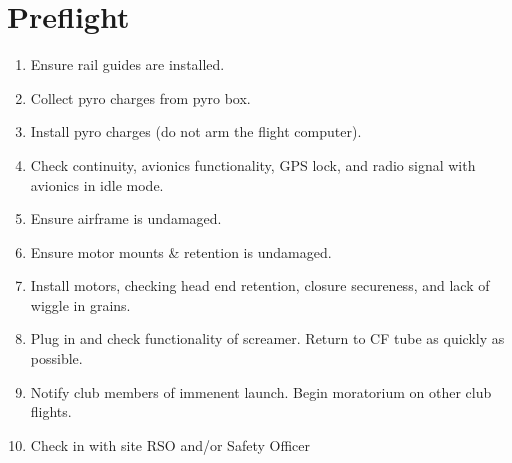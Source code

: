 \documentclass[12pt]{article}
\begin{document}
\section{Preflight}
\begin{addmargin}[3em]{3em}
	\begin{enumerate}[label=\thesection.\arabic*\quad$\square$]
		\item Ensure rail guides are installed.
		\item Collect pyro charges from pyro box.
		\item Install pyro charges (do not arm the flight computer).
		\item Check continuity, avionics functionality, GPS lock, and radio signal with avionics in idle mode.
		\item Ensure airframe is undamaged.
		\item Ensure motor mounts \& retention is undamaged.
		\item Install motors, checking head end retention, closure secureness, and lack of wiggle in grains.
		\item Plug in and check functionality of screamer. Return to CF tube as quickly as possible.
		\item Notify club members of immenent launch. Begin moratorium on other club flights.
		\item Check in with site RSO and/or Safety Officer
	\end{enumerate}
\end{addmargin}
\end{document}
